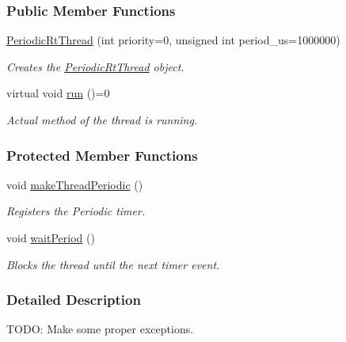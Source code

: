 \subsubsection*{\-Public \-Member \-Functions}
\begin{DoxyCompactItemize}
\item 
\hyperlink{class_u_s_u_1_1_periodic_rt_thread_a1106f9ea06df9739369c5994be340624}{\-Periodic\-Rt\-Thread} (int priority=0, unsigned int period\-\_\-us=1000000)
\begin{DoxyCompactList}\small\item\em \-Creates the \hyperlink{class_u_s_u_1_1_periodic_rt_thread}{\-Periodic\-Rt\-Thread} object. \end{DoxyCompactList}\item 
virtual void \hyperlink{class_u_s_u_1_1_periodic_rt_thread_ac9146b3088a9b268594ce41d002d020a}{run} ()=0
\begin{DoxyCompactList}\small\item\em \-Actual method of the thread is running. \end{DoxyCompactList}\end{DoxyCompactItemize}
\subsubsection*{\-Protected \-Member \-Functions}
\begin{DoxyCompactItemize}
\item 
void \hyperlink{class_u_s_u_1_1_periodic_rt_thread_a99fd532b61ad6fd0481b842343c8e954}{make\-Thread\-Periodic} ()
\begin{DoxyCompactList}\small\item\em \-Registers the \-Periodic timer. \end{DoxyCompactList}\item 
void \hyperlink{class_u_s_u_1_1_periodic_rt_thread_a4664082b226e48204cb35fc7715b82fd}{wait\-Period} ()
\begin{DoxyCompactList}\small\item\em \-Blocks the thread until the next timer event. \end{DoxyCompactList}\end{DoxyCompactItemize}


\subsubsection{\-Detailed \-Description}
\-T\-O\-D\-O\-: \-Make some proper exceptions. 

